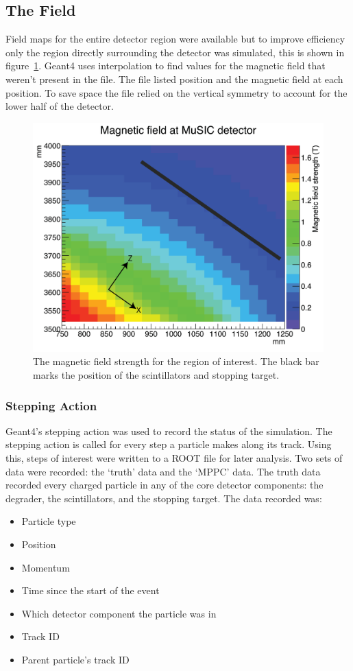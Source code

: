\subsection{The Field} %
\label{sec:the_field}
Field maps for the entire detector region were available but to improve efficiency only the region directly surrounding the detector was simulated, this is shown in figure~\ref{fig:images_field_map_edited}. Geant4 uses interpolation to find values for the magnetic field that weren't present in the file. The file listed position and the magnetic field at each position. To save space the file relied on the vertical symmetry to account for the lower half of the detector.

\begin{figure}[hptb]
  \centering
    \includegraphics[width=.8\textwidth]{images/field_map_edited.png}
  \caption{The magnetic field strength for the region of interest. The black bar marks the position of the scintillators and stopping target.}
  \label{fig:images_field_map_edited}
\end{figure}

\subsubsection{Stepping Action} %
\label{sub:stepping_action}
Geant4's stepping action was used to record the status of the simulation. The stepping action is called for every step a particle makes along its track. Using this, steps of interest were written to a ROOT file for later analysis. Two sets of data were recorded: the `truth' data and the `MPPC' data. The truth data recorded every charged particle in any of the core detector components: the degrader, the scintillators, and the stopping target. The data recorded was:
\begin{itemize}
  \item Particle type
  \item Position
  \item Momentum
  \item Time since the start of the event
  \item Which detector component the particle was in
  \item Track ID
  \item Parent particle's track ID
\end{itemize}

